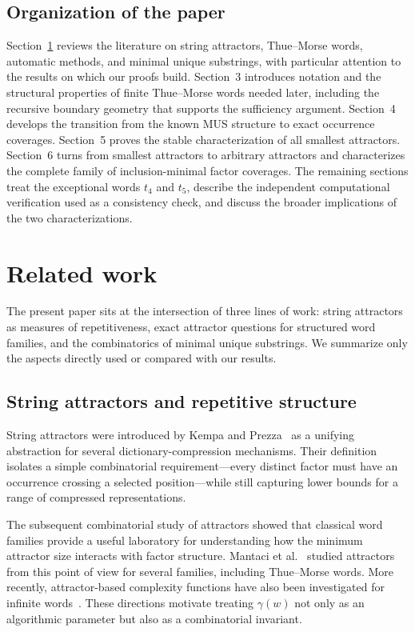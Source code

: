 \documentclass[10pt,a4paper]{article}
\theoremstyle{definition}\newtheorem{definition}[theorem]{Definition}
\theoremstyle{remark}\newtheorem{remark}[theorem]{Remark}
\begin{document}
\subsection{Organization of the paper}
Section~\ref{sec:related-work} reviews the literature on string attractors, Thue--Morse words, automatic methods, and minimal unique substrings, with particular attention to the results on which our proofs build. Section~3 introduces notation and the structural properties of finite Thue--Morse words needed later, including the recursive boundary geometry that supports the sufficiency argument. Section~4 develops the transition from the known MUS structure to exact occurrence coverages. Section~5 proves the stable characterization of all smallest attractors. Section~6 turns from smallest attractors to arbitrary attractors and characterizes the complete family of inclusion-minimal factor coverages. The remaining sections treat the exceptional words $t_4$ and $t_5$, describe the independent computational verification used as a consistency check, and discuss the broader implications of the two characterizations.



\section{Related work}
\label{sec:related-work}

The present paper sits at the intersection of three lines of work: string attractors as measures of repetitiveness, exact attractor questions for structured word families, and the combinatorics of minimal unique substrings. We summarize only the aspects directly used or compared with our results.

\subsection{String attractors and repetitive structure}
String attractors were introduced by Kempa and Prezza~\cite{KempaPrezza2018} as a unifying abstraction for several dictionary-compression mechanisms. Their definition isolates a simple combinatorial requirement---every distinct factor must have an occurrence crossing a selected position---while still capturing lower bounds for a range of compressed representations.

The subsequent combinatorial study of attractors showed that classical word families provide a useful laboratory for understanding how the minimum attractor size interacts with factor structure. Mantaci et al.~\cite{Mantaci2019,Mantaci2021} studied attractors from this point of view for several families, including Thue--Morse words. More recently, attractor-based complexity functions have also been investigated for infinite words~\cite{Cassaigne2024}. These directions motivate treating $\gamma(w)$ not only as an algorithmic parameter but also as a combinatorial invariant.
\end{document}
